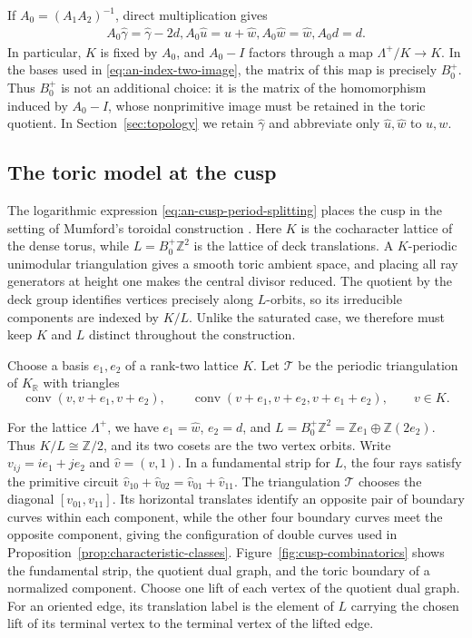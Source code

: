 \documentclass[11pt]{article}
\theoremstyle{definition}
\theoremstyle{remark}
\numberwithin{equation}{section}
\begin{document}
If $A_0=(A_1A_2)^{-1}$, direct multiplication gives
\begin{equation}\label{eq:an-cusp-monodromy-interface}
 \begin{aligned}
 A_0\widehat\gamma=\widehat\gamma-2d,
 A_0\widehat u=\widehat u+\widehat w,
 A_0\widehat w=\widehat w,
 A_0d=d.
 \end{aligned}
\end{equation}
In particular, $K$ is fixed by $A_0$, and $A_0-I$ factors through a
map $\Lambda^+/K\to K$.  In the bases used in
\eqref{eq:an-index-two-image}, the matrix of this map is precisely
$B_0^+$.  Thus $B_0^+$ is not an additional choice: it is the matrix of
the homomorphism induced by $A_0-I$, whose nonprimitive image must be
retained in the toric quotient.
In Section~\ref{sec:topology} we retain $\widehat\gamma$ and abbreviate
only $\widehat u,\widehat w$ to $u,w$.

\subsection{The toric model at the cusp}

The logarithmic expression \eqref{eq:an-cusp-period-splitting} places the
cusp in the setting of Mumford's toroidal construction
\citep[Sections~2--3]{Mumford1972}.  Here $K$ is the
cocharacter lattice of the dense torus, while
$L=B_0^+\mathbb Z^2$ is the lattice of deck translations.  A
$K$-periodic unimodular triangulation gives a smooth toric ambient space,
and placing all ray generators at height one makes the central divisor
reduced.  The quotient by the deck group identifies vertices precisely along
$L$-orbits, so its irreducible components are indexed by $K/L$.  Unlike
the saturated case, we therefore must keep $K$ and $L$ distinct
throughout the construction.

Choose a basis $e_1,e_2$ of a rank-two lattice $K$.  Let $\mathcal T$
be the periodic triangulation of $K_{\mathbb R}$ with triangles
\[
 \operatorname{conv}(v,v+e_1,v+e_2),
 \qquad
 \operatorname{conv}(v+e_1,v+e_2,v+e_1+e_2),\qquad v\in K.
\]%

For the lattice $\Lambda^+$, we have
$e_1=\widehat w$, $e_2=d$, and
$L=B_0^+\mathbb Z^2=\mathbb Ze_1\oplus\mathbb Z(2e_2)$.
Thus $K/L\cong\mathbb Z/2$, and its two cosets are the two vertex orbits.
Write $v_{ij}=ie_1+je_2$ and $\widehat v=(v,1)$.  In a fundamental
strip for $L$, the four rays satisfy the primitive circuit
$\widehat v_{10}+\widehat v_{02}
=\widehat v_{01}+\widehat v_{11}$.
The triangulation $\mathcal T$ chooses the diagonal
$[v_{01},v_{11}]$.  Its horizontal translates identify an opposite pair
of boundary curves within each component, while the other four
boundary curves meet the opposite component, giving the configuration of
double curves used in Proposition~\ref{prop:characteristic-classes}.
Figure~\ref{fig:cusp-combinatorics} shows the fundamental strip, the quotient
dual graph, and the toric boundary of a normalized component.  Choose one
lift of each vertex of the
quotient dual graph.  For an oriented edge, its translation label is the
element of $L$ carrying the chosen lift of its terminal vertex to the
terminal vertex of the lifted edge.
\end{document}
